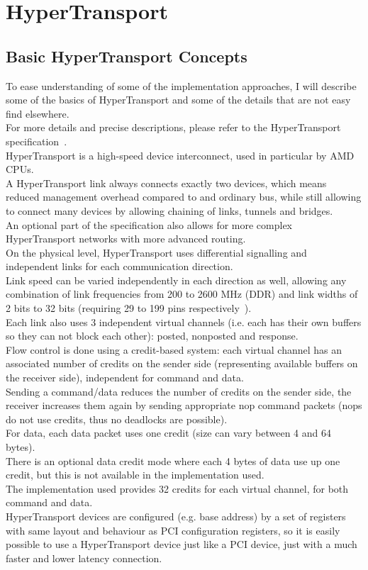 \chapter{HyperTransport}

\section{Basic HyperTransport Concepts}

To ease understanding of some of the implementation approaches, I will describe
some of the basics of HyperTransport and some of the details that are not easy
find elsewhere.\\
For more details and precise descriptions, please refer to the HyperTransport
specification~\cite{htspec}.\\
HyperTransport is a high-speed device interconnect, used in particular by AMD
CPUs.\\
A HyperTransport link always connects exactly two devices, which means reduced
management overhead compared to and ordinary bus, while still allowing to
connect many devices by allowing chaining of links, tunnels and bridges.\\
An optional part of the specification also allows for more complex
HyperTransport networks with more advanced routing.\\
On the physical level, HyperTransport uses differential signalling and
independent links for each communication direction.\\
Link speed can be varied independently in each direction as well, allowing
any combination of link frequencies from 200 to 2600 MHz (DDR) and link widths
of 2 bits to 32 bits (requiring 29 to 199 pins respectively~\cite{htarch}).\\
Each link also uses 3 independent virtual channels (i.e. each has their own
buffers so they can not block each other): posted, nonposted and response.\\
Flow control is done using a credit-based system: each virtual channel has an
associated number of credits on the sender side (representing available buffers
on the receiver side), independent for command and data.\\
Sending a command/data reduces the number of credits on the sender side,
the receiver increases them again by sending appropriate nop command packets
(nops do not use credits, thus no deadlocks are possible).\\
For data, each data packet uses one credit (size can vary between 4 and 64
bytes).\\
There is an optional data credit mode where each 4 bytes of data use up one
credit, but this is not available in the implementation used.\\
The implementation used provides 32 credits for each virtual channel, for both
command and data.\\
HyperTransport devices are configured (e.g. base address) by a set of registers
with same layout and behaviour as PCI configuration registers, so it is easily
possible to use a HyperTransport device just like a PCI device, just with a much
faster and lower latency connection.\\

